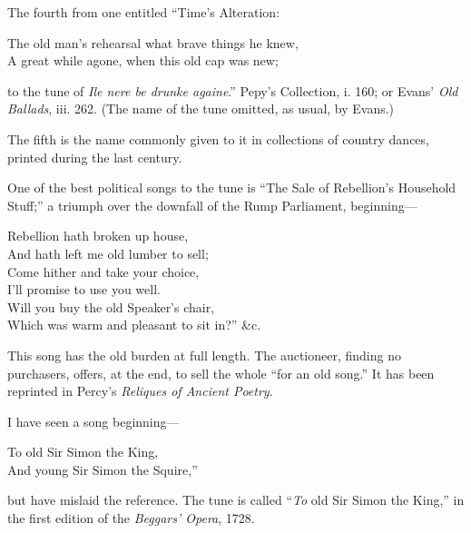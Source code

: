 The fourth from one entitled “Time’s Alteration:
\settowidth{\versewidth}{The old man’s rehearsal what brave things he knew,}
\begin{scverse}
The old man’s rehearsal what brave things he knew,\\
A great while agone, when this old cap was new;
\end{scverse}
to the tune of \textit{Ile nere be drunke againe}.” Pepy’s Collection, i. 160; or Evans’
\textit{Old Ballads}, iii. 262. (The name of the tune omitted, as usual, by Evans.)

The fifth is the name commonly given to it in collections of country dances,
printed during the last century.

One of the best political songs to the tune is “The Sale of Rebellion’s
Household Stuff;” a triumph over the downfall of the Rump Parliament,
beginning—
\settowidth{\versewidth}{Which was warm and pleasant to sit in?” \&c.}
\begin{scverse}
\begin{altverse}
Rebellion hath broken up house,\\
And hath left me old lumber to sell;\\
Come hither and take your choice,\\
I’ll promise to use you well.\\
Will you buy the old Speaker’s chair,\\
Which was warm and pleasant to sit in?” \&c.
\end{altverse}
\end{scverse}

This song has the old burden at full length. The auctioneer, finding no purchasers,
offers, at the end, to sell the whole “for an old song.” It has been reprinted
in Percy’s \textit{Reliques of Ancient Poetry}.

I have seen a song beginning—
\settowidth{\versewidth}{And young Sir Simon the Squire,”}
\begin{scverse}
To old Sir Simon the King,\\
And young Sir Simon the Squire,”
\end{scverse}
but have mislaid the reference. The tune is called “\textit{To} old Sir Simon the King,”
in the first edition of the \textit{Beggars’ Opera}, 1728.

